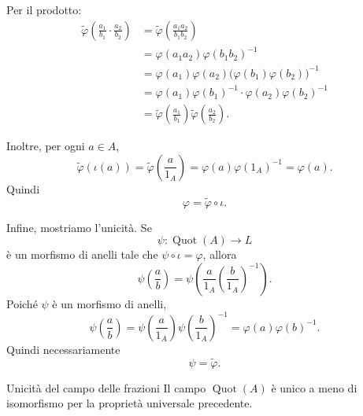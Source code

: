 \documentclass[a4paper]{article}
\begin{document}
\begin{radioactive}
\begin{snippetproof}{}
    Per il prodotto:
    \begin{align*}
        \widetilde{\varphi}\left(
            \frac{a_1}{b_1}\cdot\frac{a_2}{b_2}
        \right)
        &=
        \widetilde{\varphi}\left(
            \frac{a_1a_2}{b_1b_2}
        \right) \\
        &=
        \varphi(a_1a_2)\varphi(b_1b_2)^{-1} \\
        &=
        \varphi(a_1)\varphi(a_2)
        \big(\varphi(b_1)\varphi(b_2)\big)^{-1} \\
        &=
        \varphi(a_1)\varphi(b_1)^{-1}
        \cdot
        \varphi(a_2)\varphi(b_2)^{-1} \\
        &=
        \widetilde{\varphi}\left(\frac{a_1}{b_1}\right)
        \widetilde{\varphi}\left(\frac{a_2}{b_2}\right).
    \end{align*}

    Inoltre, per ogni \(a\in A\),
    \[
        \widetilde{\varphi}(\iota(a))
        =
        \widetilde{\varphi}\left(\frac{a}{1_A}\right)
        =
        \varphi(a)\varphi(1_A)^{-1}
        =
        \varphi(a).
    \]
    Quindi
    \[
        \varphi=\widetilde{\varphi}\circ \iota.
    \]

    Infine, mostriamo l'unicità. Se
    \[
        \psi\colon \operatorname{Quot}(A)\to L
    \]
    è un morfismo di anelli tale che \(\psi\circ \iota=\varphi\), allora
    \[
        \psi\left(\frac{a}{b}\right)
        =
        \psi\left(
            \frac{a}{1_A}
            \left(\frac{b}{1_A}\right)^{-1}
        \right).
    \]
    Poiché \(\psi\) è un morfismo di anelli,
    \[
        \psi\left(\frac{a}{b}\right)
        =
        \psi\left(\frac{a}{1_A}\right)
        \psi\left(\frac{b}{1_A}\right)^{-1}
        =
        \varphi(a)\varphi(b)^{-1}.
    \]
    Quindi necessariamente
    \[
        \psi=\widetilde{\varphi}.
    \]
\end{snippetproof}
\end{radioactive}

\begin{radioactive}
\begin{snippetcorollary}{Unicità del campo delle frazioni}
    Il campo \(\operatorname{Quot}(A)\) è unico a meno di isomorfismo per la proprietà universale precedente.
\end{snippetcorollary}
\end{radioactive}
\end{document}
